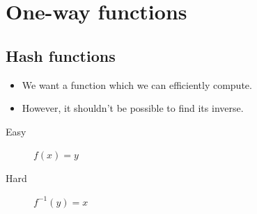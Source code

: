 \mode*




\section{One-way functions}

\subsection{Hash functions}

\begin{frame}
  \begin{idea}
    \begin{itemize}
      \item We want a function which we can efficiently compute.
      \item However, it shouldn't be possible to find its inverse.
    \end{itemize}
  \end{idea}

  \pause{}

  \begin{example}
    \begin{description}
      \item[Easy] \(f(x) = y\)
      \item[Hard] \(f^{-1}(y) = x\)
    \end{description}
  \end{example}
\end{frame}

